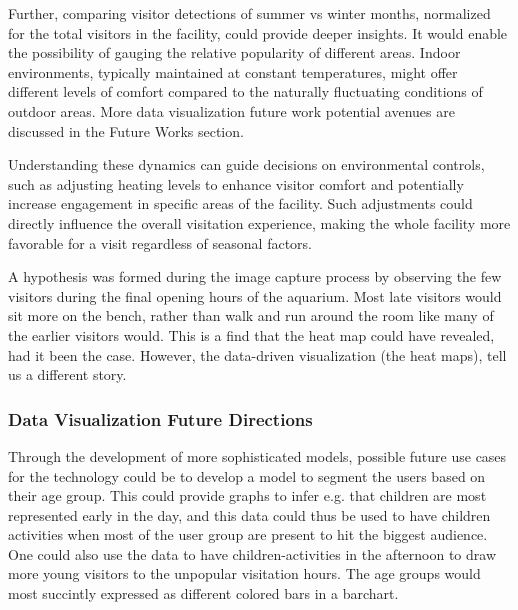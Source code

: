 Further, comparing visitor detections of summer vs winter months, normalized for the total visitors in the facility, could provide deeper insights. It would enable the possibility of gauging the relative popularity of different areas. Indoor environments, typically maintained at constant temperatures, might offer different levels of comfort compared to the naturally fluctuating conditions of outdoor areas. More data visualization future work potential avenues are discussed in the Future Works section. 

Understanding these dynamics can guide decisions on environmental controls, such as adjusting heating levels to enhance visitor comfort and potentially increase engagement in specific areas of the facility. Such adjustments could directly influence the overall visitation experience, making the whole facility more favorable for a visit regardless of seasonal factors.

A hypothesis was formed during the image capture process by observing the few visitors during the final opening hours of the aquarium. Most late visitors would sit more on the bench, rather than walk and run around the room like many of the earlier visitors would. This is a find that the heat map could have revealed, had it been the case. However, the data-driven visualization (the heat maps), tell us a different story. 

\subsubsection{Data Visualization Future Directions}
Through the development of more sophisticated models, possible future use cases for the technology could be to develop a model to segment the users based on their age group. This could provide graphs to infer e.g. that children are most represented early in the day, and this data could thus be used to have children activities when most of the user group are present to hit the biggest audience. One could also use the data to have children-activities in the afternoon to draw more young visitors to the unpopular visitation hours. The age groups would most succintly expressed as different colored bars in a barchart.  